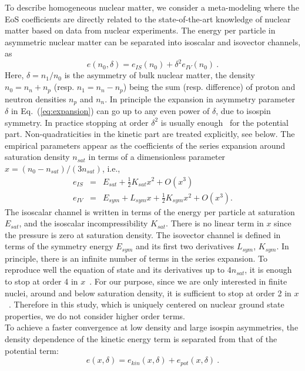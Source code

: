 \documentclass
[aps,prc,twocolumn,showpacs,showkeys,amsmath,floatfix,superscriptaddress]{revtex4}
\begin{document}
To describe homogeneous nuclear matter, we consider a meta-modeling where the  EoS  
coefficients are directly related to the state-of-the-art knowledge of nuclear matter based
on data from nuclear experiments. The energy per particle in asymmetric nuclear matter can be separated into isoscalar and isovector channels, as
\begin{equation}
e(n_0,\delta) = e_{IS}(n_0) + \delta^2 e_{IV}(n_0)~.
\label{eq:expansion}
\end{equation}
Here, $\delta=n_1/n_0$ is the asymmetry of bulk nuclear matter, the density $n_0=n_n+n_p$ (resp. $n_1=n_n-n_p$)
being the sum (resp. difference) of proton and neutron densities $n_p$ and $n_n$.
In principle the expansion in asymmetry parameter $\delta$ in Eq.~(\ref{eq:expansion}) can go up to any even power of $\delta$, due to isospin symmetry.
In practice stopping at order $\delta^2$ is usually enough~\cite{Casali1} for the potential part.
Non-quadraticities in the kinetic part are treated explicitly, see below.
The empirical parameters appear as the coefficients of the series expansion around saturation density $n_{sat}$
in terms of a dimensionless parameter $x = (n_0 - n_{sat})/(3 n_{sat}) $, i.e.,
\begin{eqnarray}
e_{IS} &=& E_{sat} + \frac{1}{2} K_{sat} x^2 + O(x^3)   \label{eq:e_is} \\
e_{IV} &=& E_{sym} + L_{sym} x + \frac{1}{2} K_{sym} x^2 + O(x^3). \label{eq:e_iv}
\end{eqnarray}
The isoscalar channel is written in terms of the energy per particle at saturation $E_{sat}$, and the isoscalar incompressibility $K_{sat}$. 
{There is no linear term in $x$ since the pressure is zero at saturation density.}
The isovector channel is defined in terms of the symmetry energy $E_{sym}$ and its first two derivatives $L_{sym}$, $K_{sym}$.  
In principle, there is an infinite number of terms in the series expansion. 
{To reproduce well the equation of state and its derivatives up to $4n_{sat}$, it is enough to stop at order 4 in $x$~\cite{Casali1}.
For our purpose, since we are only interested in finite nuclei, around and below saturation density, it is sufficient to stop
at order 2 in $x$~\cite{Casali1}.}
Therefore in this study, which is uniquely centered on nuclear ground state properties, we do not consider higher order terms.\\

To achieve a faster convergence at low density and large isospin asymmetries, the density dependence of the kinetic energy term is separated from that of the potential term:
\begin{equation}
e (x,\delta) = e_{kin} (x,\delta) + e_{pot} (x,\delta)~.
\label{eq:e_hnm}
\end{equation}
\end{document}
